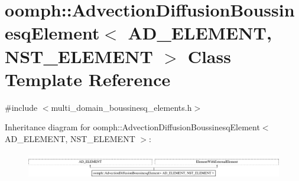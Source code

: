\hypertarget{classoomph_1_1AdvectionDiffusionBoussinesqElement}{}\section{oomph\+:\+:Advection\+Diffusion\+Boussinesq\+Element$<$ A\+D\+\_\+\+E\+L\+E\+M\+E\+NT, N\+S\+T\+\_\+\+E\+L\+E\+M\+E\+NT $>$ Class Template Reference}
\label{classoomph_1_1AdvectionDiffusionBoussinesqElement}


{\ttfamily \#include $<$multi\+\_\+domain\+\_\+boussinesq\+\_\+elements.\+h$>$}

Inheritance diagram for oomph\+:\+:Advection\+Diffusion\+Boussinesq\+Element$<$ A\+D\+\_\+\+E\+L\+E\+M\+E\+NT, N\+S\+T\+\_\+\+E\+L\+E\+M\+E\+NT $>$\+:\begin{figure}[H]
\begin{center}
\leavevmode
\includegraphics[height=1.161826cm]{classoomph_1_1AdvectionDiffusionBoussinesqElement}
\end{center}
\end{figure}
